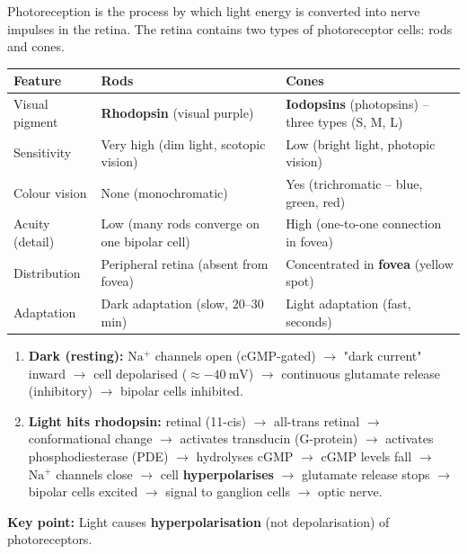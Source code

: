 \documentclass[11pt]{article}
\newcommand{\cle}[1]{{\popxbold\color{popdark}#1}}
\begin{document}
\begin{definition}[Photoreception]
\cle{Photoreception} is the process by which light energy is converted into nerve impulses in the retina. The retina contains two types of photoreceptor cells: \cle{rods} and \cle{cones}.
\end{definition}

\begin{propriete}
\begin{center}
\begin{tabularx}{\linewidth}{|l|X|X|}
\hline
\rowcolor{popblueL} \textbf{Feature} & \textbf{Rods} & \textbf{Cones} \\
\hline
Visual pigment & \textbf{Rhodopsin} (visual purple) & \textbf{Iodopsins} (photopsins) -- three types (S, M, L) \\
\hline
Sensitivity & Very high (dim light, scotopic vision) & Low (bright light, photopic vision) \\
\hline
Colour vision & None (monochromatic) & Yes (trichromatic -- blue, green, red) \\
\hline
Acuity (detail) & Low (many rods converge on one bipolar cell) & High (one-to-one connection in fovea) \\
\hline
Distribution & Peripheral retina (absent from fovea) & Concentrated in \textbf{fovea} (yellow spot) \\
\hline
Adaptation & Dark adaptation (slow, 20--30 min) & Light adaptation (fast, seconds) \\
\hline
\end{tabularx}
\end{center}
\end{propriete}

\begin{propriete}
\begin{enumerate}
\item \textbf{Dark (resting):} $\mathrm{Na^{+}}$ channels open (cGMP-gated) $\rightarrow$ "dark current" inward $\rightarrow$ cell depolarised ($\approx -40\ \mathrm{mV}$) $\rightarrow$ continuous glutamate release (inhibitory) $\rightarrow$ bipolar cells inhibited.
\item \textbf{Light hits rhodopsin:} retinal (11-cis) $\rightarrow$ all-trans retinal $\rightarrow$ conformational change $\rightarrow$ activates \cle{transducin} (G-protein) $\rightarrow$ activates \cle{phosphodiesterase (PDE)} $\rightarrow$ hydrolyses cGMP $\rightarrow$ cGMP levels fall $\rightarrow$ $\mathrm{Na^{+}}$ channels close $\rightarrow$ cell \textbf{hyperpolarises} $\rightarrow$ glutamate release stops $\rightarrow$ bipolar cells excited $\rightarrow$ signal to ganglion cells $\rightarrow$ optic nerve.
\end{enumerate}
\textbf{Key point:} Light causes \textbf{hyperpolarisation} (not depolarisation) of photoreceptors.
\end{propriete}
\end{document}

